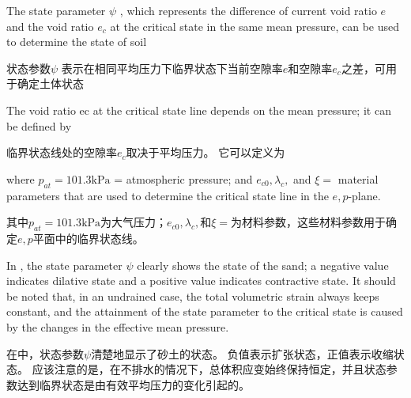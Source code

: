 \begin{ParaColumn}
    
    The state parameter $\psi$ \citep{Been1985}, which represents the difference of current void ratio $e$ and the void ratio $e_c$ at the critical state in the same mean pressure, can be used to determine the state of soil

    \switchcolumn

    状态参数$\psi$ \citep{Been1985}表示在相同平均压力下临界状态下当前空隙率$e$和空隙率$e_c$之差，可用于确定土体状态

    \switchcolumn*

    \noindent
    The void ratio ec at the critical state line depends on the mean pressure; it can be defined by \citep{Yang2004}

    \switchcolumn

    \noindent
    临界状态线处的空隙率$e_c$取决于平均压力。 它可以定义为\citep{Yang2004}

    \switchcolumn*

    \noindent
    where $p_{a t}=101.3 \mathrm{kPa}$ = atmospheric pressure; and $e_{c 0}, \lambda_{c},$ and $\xi=$ material parameters that are used to determine the critical state line in the $e, p$-plane.

    \switchcolumn

    \noindent
    其中$p_{a t}=101.3 \mathrm{kPa}$为大气压力；$e_{c 0}, \lambda_{c},$和$\xi=$为材料参数，这些材料参数用于确定$e,p$平面中的临界状态线。

    \switchcolumn*

    In , the state parameter $\psi$ clearly shows the state of the sand; a negative value indicates dilative state and a positive value indicates contractive state. It should be noted that, in an undrained case, the total volumetric strain always keeps constant, and the attainment of the state parameter to the critical state is caused by the changes in the effective mean pressure.

    \switchcolumn

    在中，状态参数$\psi$清楚地显示了砂土的状态。 负值表示扩张状态，正值表示收缩状态。 应该注意的是，在不排水的情况下，总体积应变始终保持恒定，并且状态参数达到临界状态是由有效平均压力的变化引起的。

    \CrossColumnText{
        
    }

\end{ParaColumn}